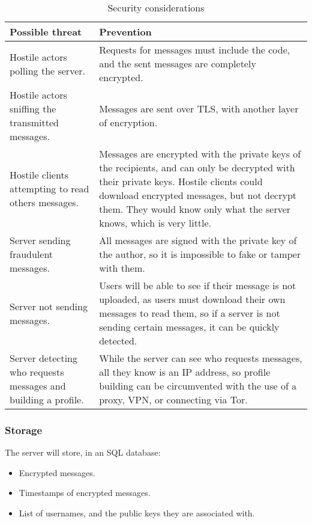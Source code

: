 \documentclass{article}
\begin{document}
\begin{table}[H]
    \centering
    \caption{Security considerations}
    \vspace{0.2cm}
    \begin{tabular}{p{}p{}}
    \toprule
    \textbf{Possible threat} & \textbf{Prevention}\\
    \midrule
    Hostile actors polling the server. & Requests for messages must include the code, and the sent messages are completely encrypted.\\
    \midrule
    Hostile actors sniffing the transmitted messages. & Messages are sent over TLS, with another layer of encryption.\\
    \midrule
    Hostile clients attempting to read others messages. & Messages are encrypted with the private keys of the recipients, and can only be decrypted with their private keys. Hostile clients could download encrypted messages, but not decrypt them. They would know only what the server knows, which is very little.\\
    \midrule
    Server sending fraudulent messages. & All messages are signed with the private key of the author, so it is impossible to fake or tamper with them.\\
    \midrule
    Server not sending messages. & Users will be able to see if their message is not uploaded, as users must download their own messages to read them, so if a server is not sending certain messages, it can be quickly detected.\\
    \midrule
    Server detecting who requests messages and building a profile. & While the server can see who requests messages, all they know is an IP address, so profile building can be circumvented with the use of a proxy, VPN, or connecting via Tor.\\
    \bottomrule
    \end{tabular}
    \label{tab:secconsrecv}
\end{table}
\subsubsection{Storage}
The server will store, in an SQL database:
\begin{itemize}
    \item Encrypted messages.
    \item Timestamps of encrypted messages.
    \item List of usernames, and the public keys they are associated with.
\end{itemize}
\end{document}
